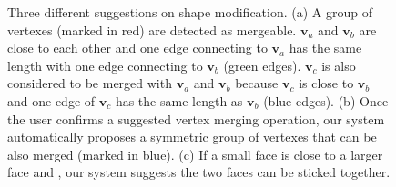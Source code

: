 \begin{figure}
	\centering
	 \hfill
	 \hfill
	 
	 \caption{Three different suggestions on shape modification. (a) A group of vertexes (marked in red) are detected as mergeable. $\mathbf{v}_a$ and $\mathbf{v}_b$ are close to each other and one edge connecting to $\mathbf{v}_a$ has the same length with one edge connecting to $\mathbf{v}_b$ (green edges). $\mathbf{v}_c$ is also considered to be merged with $\mathbf{v}_a$ and $\mathbf{v}_b$ because $\mathbf{v}_c$ is close to $\mathbf{v}_b$ and one edge of $\mathbf{v}_c$ has the same length as $\mathbf{v}_b$ (blue edges). (b) Once the user confirms a suggested vertex merging operation, our system automatically proposes a symmetric group of vertexes that can be also merged (marked in blue). (c) If a small face is close to a larger face and , our system suggests the two faces can be sticked together. }
	 \label{fig:suggestion}
\end{figure}

